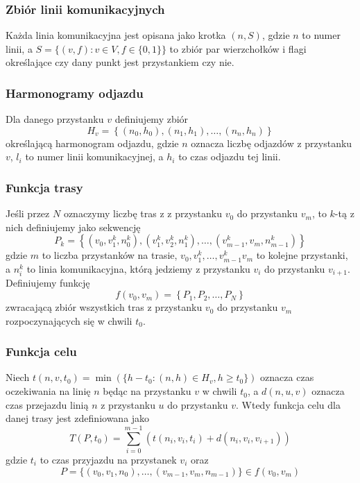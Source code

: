 \documentclass{article}
\begin{document}
\subsubsection{Zbiór linii komunikacyjnych}
Każda linia komunikacyjna jest opisana jako krotka \((n, S)\),
gdzie \(n\) to numer linii, a \(S = \{(v, f) : v\in V, f\in\{0, 1\}\}\) to zbiór par wierzchołków i flagi określające czy dany punkt jest przystankiem czy nie.

\subsubsection{Harmonogramy odjazdu}
Dla danego przystanku \(v\) definiujemy zbiór \[H_v = \left\{(n_0, h_0), (n_1, h_1), \dots, (n_n, h_n)\right\}\]
określającą harmonogram odjazdu, gdzie \(n\) oznacza liczbę odjazdów z przystanku \(v\),
\(l_i\) to numer linii komunikacyjnej, a \(h_i\) to czas odjazdu tej linii.

\subsubsection{Funkcja trasy}
Jeśli przez \(N\) oznaczymy liczbę tras z z przystanku \(v_0\) do przystanku \(v_m\), to \(k\)-tą z nich definiujemy jako sekwencję
\[P_k = \left\{(v_0, v_1^k, n_0^k), (v_1^k, v_2^k, n_1^k), \ldots, (v_{m - 1}^k, v_{m}, n_{m - 1}^k)\right\}\]
gdzie \(m\) to liczba przystanków na trasie, \(v_0, v_1^k, \dots, v_{m - 1}^k v_m\) to kolejne przystanki, a \(n_i^k\) to linia komunikacyjna, którą jedziemy z przystanku \(v_i\) do przystanku \(v_{i + 1}\).
Definiujemy funkcję
\[f(v_0, v_m) = \left\{P_1, P_2, \dots, P_N\right\}\]
zwracającą zbiór wszystkich tras z przystanku \(v_0\) do przystanku \(v_m\) rozpoczynających się w chwili \(t_0\).

\subsubsection{Funkcja celu}
Niech \(t(n, v, t_0) = \min(\{h - t_0 : (n, h)\in H_v, h \geq t_0\})\) oznacza czas oczekiwania na linię \(n\) będąc na przystanku \(v\)
w chwili \(t_0\), a \(d(n, u, v)\) oznacza czas przejazdu linią \(n\) z przystanku \(u\) do przystanku \(v\). Wtedy funkcja celu
dla danej trasy jest zdefiniowana jako
\[
    T(P, t_0) = \sum_{i = 0}^{m - 1}(t(n_i, v_i, t_i) + d(n_i, v_i, v_{i + 1}))
\]
gdzie \(t_i\) to czas przyjazdu na przystanek \(v_i\) oraz \[P = \{(v_0, v_1, n_0),\dots,(v_{m - 1}, v_m, n_{m - 1})\}\in f(v_0, v_m)\]
\end{document}
